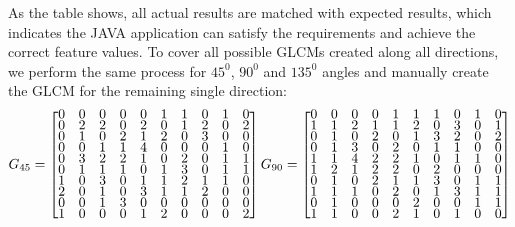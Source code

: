 As the table shows, all actual results are matched with expected results, which indicates the JAVA application can satisfy the requirements and achieve the correct feature values. To cover all possible GLCMs created along all directions, we perform the same process for $45^0$, $90^0$ and $135^0$ angles and manually create the GLCM for the remaining single direction:
\begin{align*}
G_{45} = 
\renewcommand{\arraystretch}{0.5}
\begin{bmatrix}
     0&     0&     0&     0&     0 &    1&     1&     0&     1&     0\\
     0&     2&     2&     0&     2 &    0&     1&     2&     0&     2\\
     0&     1&     0&     2&     1 &    2&     0&     3&     0&     0\\
     0&     0&     1&     1&     4 &    0&     0&     0&     1&     0\\
     0&     3&     2&     2&     1 &    0&     2&     0&     1&     1\\
     0&     1&     1&     1&     0 &    1&     3&     0&     1&     1\\
     1&     0&     3&     0&     1 &    1&     2&     1&     1&     0\\
     2&     0&     1&     0&     3 &    1&     1&     2&     0&     0\\
     0&     0&     1&     3&     0 &    0&     0&     0&     0&     0\\
     1&     0&     0&     0&     1 &    2&     0&     0&     0&     2
\end{bmatrix}
G_{90} = 
\begin{bmatrix}
     0&     0&     0&     0&     1&     1&     1&     0&     1&     0\\
     1&     1&     2&     1&     1&     2&     0&     3&     0&     1\\
     0&     1&     0&     2&     0&     1&     3&     2&     0&     2\\
     0&     1&     3&     0&     2&     0&     1&     1&     0&     0\\
     1&     1&     4&     2&     2&     1&     0&     1&     1&     0\\
     1&     2&     1&     2&     2&     0&     2&     0&     0&     0\\
     0&     1&     0&     2&     1&     1&     3&     0&     1&     1\\
     1&     1&     1&     0&     2&     0&     1&     3&     1&     1\\
     0&     1&     0&     0&     0&     2&     0&     0&     1&     1\\
     1&     1&     0&     0&     2&     1&     0&     1&     0&     0
\end{bmatrix}
\end{align*}
